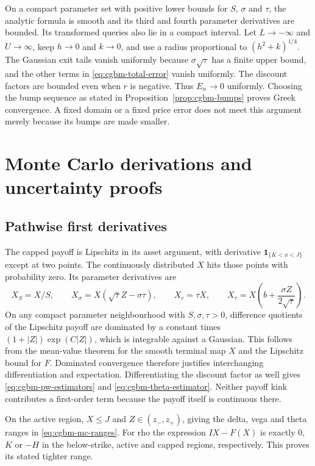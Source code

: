 \documentclass[11pt]{article}
\begin{document}
On a compact parameter set with positive lower bounds for $S$, $\sigma$
and $\tau$, the analytic formula is smooth and its third and fourth
parameter derivatives are bounded. Its transformed queries also lie in
a compact interval. Let $L\to-\infty$ and $U\to\infty$, keep
$h\to0$ and $k\to0$, and use a radius proportional to
$(h^2+k)^{1/4}$. The Gaussian exit tails vanish uniformly because
$\sigma\sqrt{\tau}$ has a finite upper bound, and the other terms in
\eqref{eq:cgbm-total-error} vanish uniformly. The discount factors are
bounded even when $r$ is negative. Thus $E_n\to0$ uniformly. Choosing
the bump sequence as stated in Proposition~\ref{prop:cgbm-bumps} proves
Greek convergence. A fixed domain or a fixed price error does not meet
this argument merely because its bumps are made smaller.

\section{Monte Carlo derivations and uncertainty proofs}
\label{app:cgbm-monte-carlo}

\subsection{Pathwise first derivatives}

The capped payoff is Lipschitz in its asset argument, with derivative
$\mathbf 1_{\{K<x<J\}}$ except at two points. The continuously distributed
$X$ hits those points with probability zero. Its parameter derivatives are
\begin{equation}
 X_S=X/S,\qquad X_\sigma=X(\sqrt{\tau}Z-\sigma\tau),\qquad
 X_r=\tau X,\qquad
 X_\tau=X\left(b+\frac{\sigma Z}{2\sqrt{\tau}}\right).
 \label{eq:cgbm-path-derivatives}
\end{equation}
On any compact parameter neighbourhood with $S,\sigma,\tau>0$, difference
quotients of the Lipschitz payoff are dominated by a constant times
$(1+|Z|)\exp(C|Z|)$, which is integrable against a Gaussian. This follows
from the mean-value theorem for the smooth terminal map $X$ and the
Lipschitz bound for $F$. Dominated convergence therefore justifies
interchanging differentiation and expectation. Differentiating the
discount factor as well gives
\eqref{eq:cgbm-pw-estimators} and \eqref{eq:cgbm-theta-estimator}.
Neither payoff kink contributes a first-order term because the payoff
itself is continuous there.

On the active region, $X\leq J$ and $Z\in(z_-,z_+)$, giving the delta,
vega and theta ranges in \eqref{eq:cgbm-mc-ranges}. For rho the expression
$IX-F(X)$ is exactly $0$, $K$ or $-H$ in the below-strike, active and
capped regions, respectively. This proves its stated tighter range.
\end{document}
